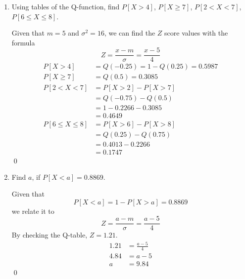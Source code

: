 \documentclass[11pt]{article}
\begin{document}
\begin{enumerate}[label=(\alph*)]
    \item Using tables of the Q-function, find $P[X > 4]$, $P[X \geq 7]$, $P[2 < X < 7]$, $P[6 \leq X \leq 8]$.
    \begin{solution}
        Given that $m = 5$ and $\sigma^2 = 16$, we can find the $Z$ score values with the formula
        \[
            Z = \frac{x - m}{\sigma} = \frac{x - 5}{4}
        \]
        \begin{align*}
            P[X > 4] &= Q(-0.25) = 1 - Q(0.25) = 0.5987 \\[1em]
            P[X \geq 7] &= Q(0.5) = 0.3085 \\[1em]
            P[2 < X < 7] &= P[X > 2] - P[X > 7] \\
            &= Q(-0.75) - Q(0.5) \\
            &= 1 - 0.2266 - 0.3085 \\
            &= 0.4649 \\[1em]
            P[6 \leq X \leq 8] &= P[X > 6] - P[X > 8] \\
            &= Q(0.25) - Q(0.75) \\
            &= 0.4013 - 0.2266 \\
            &= 0.1747
        \end{align*}
        \qed
    \end{solution}

    \item Find $a$, if $P[X < a] = 0.8869$.
    \begin{solution}
        Given that
        \[
            P[X < a] = 1 - P[X > a] = 0.8869
        \]
        we relate it to
        \[
            Z = \frac{a - m}{\sigma} = \frac{a - 5}{4}
        \]
        By checking the Q-table, $Z = 1.21$.
        \begin{align*}
            1.21 &= \frac{a - 5}{4}\\
            4.84 &= a - 5\\
            a &= 9.84
        \end{align*}
        \qed
    \end{solution}

    \vspace{3em}


\end{enumerate}
\end{document}
